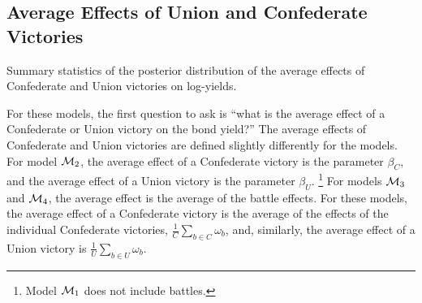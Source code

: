 \subsection{Average Effects of Union and Confederate Victories}
\label{sec:future-battles}

\begin{table}
  \centering
  \small
  
  \caption{Summary statistics of the posterior distribution of the average effects of Confederate and Union victories on log-yields.}
  \label{bonds:tab:avg_battle_effects}
\end{table}

For these models, the first question to ask is ``what is the average effect of a Confederate or Union victory on the bond yield?''
The average effects of Confederate and Union victories are defined slightly differently for the models.
For model $\mathcal{M}_{\text{2}}$, the average effect of a Confederate victory is the parameter $\beta_{C}$, and the average effect of a Union victory is the parameter $\beta_{U}$.%
\footnote{Model $\mathcal{M}_{\text{1}}$ does not include battles.}
For models $\mathcal{M}_{\text{3}}$ and $\mathcal{M}_{\text{4}}$, the average effect is the average of the battle effects.
For these models, the average effect of a Confederate victory is the average of the effects of the individual Confederate victories, $\frac{1}{C}\sum_{b \in C} \omega_{b}$, and, similarly, the average effect of a Union victory is $\frac{1}{U}\sum_{b \in U} \omega_{b}$.

